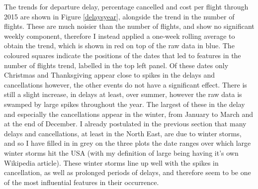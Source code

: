 \documentclass[a4paper]{article}
\begin{document}
The trends for departure delay, percentage cancelled and cost per flight through 2015 are shown in Figure \ref{delaysyear}, alongside the trend in the number of flights. These are much noisier than the number of flights, and show no significant weekly component, therefore I instead applied a one-week rolling average to obtain the trend, which is shown in red on top of the raw data in blue. The coloured squares indicate the positions of the dates that led to features in the number of flights trend, labelled in the top left panel. Of these dates only Christmas and Thanksgiving appear close to spikes in the delays and cancellations however, the other events do not have a significant effect. There is still a slight increase, in delays at least, over summer, however the raw data is swamped by large spikes throughout the year. The largest of these in the delay and especially the cancellations appear in the winter, from January to March and at the end of December. I already postulated in the previous section that many delays and cancellations, at least in the North East, are due to winter storms, and so I have filled in in grey on the three plots the date ranges over which large winter storms hit the USA (with my definition of large being having it's own Wikipedia article).\footnotemark[8]\footnotemark[9]\footnotemark[10]\footnotemark[11] These winter storms line up well with the spikes in cancellation, as well as prolonged periods of delays, and therefore seem to be one of the most influential features in their occurrence.
\end{document}
